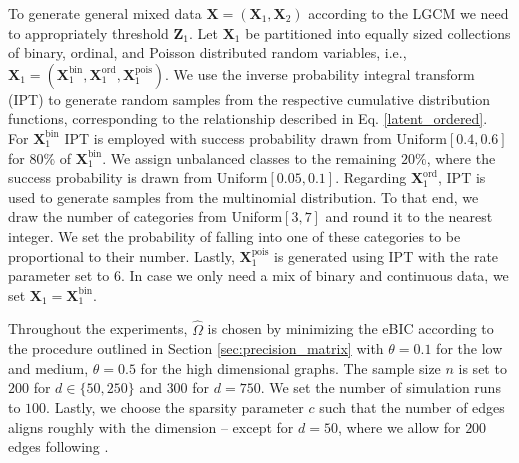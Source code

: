 To generate general mixed data \(\mathbf{X} = (\mathbf{X}_1,\mathbf{X}_2)\) according to the LGCM we need to appropriately threshold \(\mathbf{Z}_1\). Let $\mathbf{X}_1$ be partitioned into equally sized collections of binary, ordinal, and Poisson distributed random variables, i.e., $\mathbf{X}_1 = (\mathbf{X}_1^{\text{bin}}, \mathbf{X}_1^{\text{ord}},\mathbf{X}_1^{\text{pois}})$. We use the inverse probability integral transform (IPT) to generate random samples from the respective cumulative distribution functions, corresponding to the relationship described in Eq. \eqref{latent_ordered}. For $\mathbf{X}_1^{\text{bin}}$ IPT is employed with success probability drawn from Uniform$[0.4,0.6]$ for $80\%$ of $\mathbf{X}_1^{\text{bin}}$. We assign unbalanced classes to the remaining $20\%$, where the success probability is drawn from Uniform$[0.05,0.1]$. Regarding $\mathbf{X}_1^{\text{ord}}$, IPT is used to generate samples from the multinomial distribution. To that end, we draw the number of categories from Uniform$[3,7]$ and round it to the nearest integer. We set the probability of falling into one of these categories to be proportional to their number. Lastly, $\mathbf{X}_1^{\text{pois}}$ is generated using IPT with the rate parameter set to $6$. In case we only need a mix of binary and continuous data, we set \(\mathbf{X}_1 = \mathbf{X}_1^{\text{bin}}\).

Throughout the experiments, $\hat{\Omega}$ is chosen by minimizing the eBIC according to the procedure outlined in Section \ref{sec:precision_matrix} with $\theta = 0.1$ for the low and medium, $\theta = 0.5$ for the high dimensional graphs.
The sample size $n$ is set to \(200\) for \(d\in \{50, 250\}\) and \(300\) for \(d = 750\). We set the number of simulation runs to \(100\). Lastly, we choose the sparsity parameter $c$ such that the number of edges aligns roughly with the dimension -- except for $d = 50$, where we allow for $200$ edges following \citet{Fan17}.

